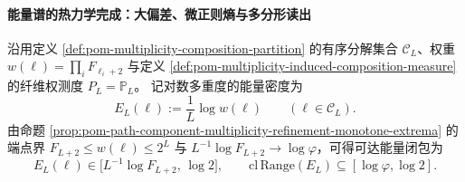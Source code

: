 \paragraph{能量谱的热力学完成：大偏差、微正则熵与多分形读出}\label{par:pom-multiplicity-energy-ldp-multifractal}
沿用定义 \ref{def:pom-multiplicity-composition-partition} 的有序分解集合 \(\mathcal{C}_L\)、权重
\(
w(\boldsymbol{\ell})=\prod_i F_{\ell_i+2}
\)
与定义 \ref{def:pom-multiplicity-induced-composition-measure} 的纤维权测度
\(
P_L=\mathbb{P}_L
\)。
记对数多重度的能量密度为
\[
E_L(\boldsymbol{\ell}):=\frac{1}{L}\log w(\boldsymbol{\ell})
\qquad(\boldsymbol{\ell}\in\mathcal{C}_L).
\]
由命题 \ref{prop:pom-path-component-multiplicity-refinement-monotone-extrema} 的端点界 \(F_{L+2}\le w(\boldsymbol{\ell})\le 2^L\) 与 \(L^{-1}\log F_{L+2}\to\log\varphi\)，可得可达能量闭包为
\[
E_L(\boldsymbol{\ell})\in\bigl[L^{-1}\log F_{L+2},\,\log 2\bigr],
\qquad
\mathrm{cl}\,\mathrm{Range}(E_L)\subseteq[\log\varphi,\log 2].
\]


